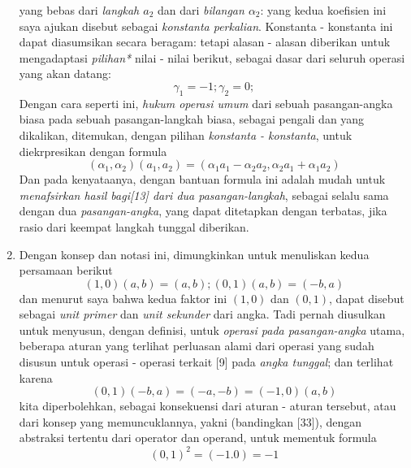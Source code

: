 \documentclass[a4paper, 12pt]{book}
\begin{document}
\begin{enumerate}
yang bebas dari \textit{langkah $a_2$} dan dari \textit{bilangan $\alpha_2$}:
yang kedua koefisien ini saya ajukan disebut sebagai 
\textit{konstanta perkalian}. Konstanta - konstanta ini dapat diasumsikan
secara beragam: tetapi alasan - alasan diberikan untuk mengadaptasi
\textit{pilihan*} nilai - nilai berikut, sebagai dasar dari seluruh
operasi yang akan datang: 
\[
\gamma_1 = -1; \gamma_2 = 0;
\]
Dengan cara seperti ini, \textit{hukum operasi umum} dari sebuah 
pasangan-angka biasa pada sebuah pasangan-langkah biasa, sebagai pengali
dan yang dikalikan, ditemukan, dengan pilihan \textit{konstanta - konstanta},
untuk diekrpresikan dengan formula
\[
(\alpha_1, \alpha_2)(a_1, a_2) = (\alpha_1 a_1 - \alpha_2 a_2, \alpha_2 a_1 + \alpha_1 a_2)
\]
Dan pada kenyataanya, dengan bantuan formula ini adalah mudah untuk
\textit{menafsirkan hasil bagi[13]  dari dua pasangan-langkah}, sebagai selalu sama
dengan dua \textit{pasangan-angka}, yang dapat ditetapkan dengan terbatas, jika
rasio dari keempat langkah tunggal diberikan.  
\item Dengan konsep dan notasi ini, dimungkinkan untuk menuliskan
kedua persamaan berikut
\[
(1, 0)(a, b) = (a, b); (0, 1)(a, b) = (-b, a)
\]
dan menurut saya bahwa kedua faktor ini $(1, 0)$ dan $(0 ,1)$, dapat disebut
sebagai \textit{unit primer} dan \textit{unit sekunder} dari angka. 
Tadi pernah
diusulkan untuk menyusun, dengan definisi, untuk 
\textit{operasi pada pasangan-angka} utama, beberapa aturan yang terlihat
perluasan alami dari operasi yang sudah disusun untuk operasi - operasi
terkait [9] pada \textit{angka tunggal}; dan terlihat karena
\[
(0, 1)(-b, a) = (-a, -b) = (-1, 0)(a, b)
\]
kita diperbolehkan, sebagai konsekuensi dari aturan - aturan tersebut, atau
dari konsep yang memuncuklannya, yakni (bandingkan [33]), dengan abstraksi 
tertentu dari operator dan operand, untuk mementuk formula
\[
(0, 1)^2 = (-1. 0) = -1
\]

\end{enumerate}
\end{document}
